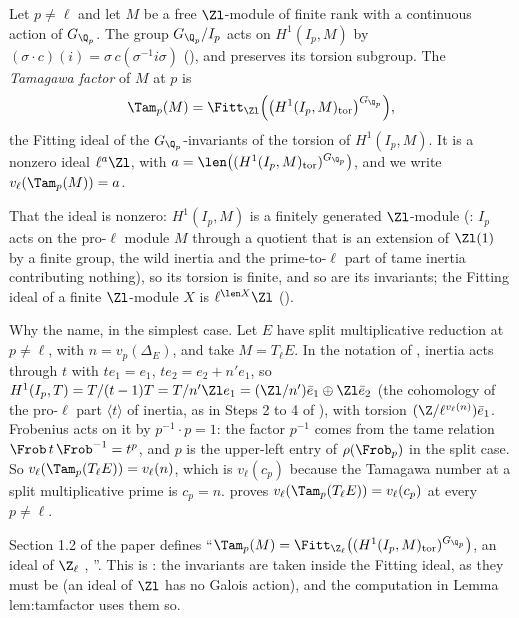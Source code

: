 \begin{definition}\label{def:blochkato:tamagawa}
Let $p\ne\ell$ and let $M$ be a free $\Zl$-module of finite rank with a continuous action of $G_{\Q_p}$. The group $G_{\Q_p}/I_p$ acts on $H^1(I_p,M)$ by
$(\sigma\cdot c)(i)=\sigma\,c(\sigma^{-1}i\sigma)$ (), and preserves its torsion subgroup. The \emph{Tamagawa factor} of $M$ at $p$ is
\[
\Tam_p(M)=\Fitt_{\Zl}\Bigl(\bigl(H^1(I_p,M)_{\mathrm{tor}}\bigr)^{G_{\Q_p}}\Bigr),
\]
the Fitting ideal of the $G_{\Q_p}$-invariants of the torsion of $H^1(I_p,M)$. It is a nonzero ideal $\ell^a\Zl$, with $a=\len\bigl((H^1(I_p,M)_{\mathrm{tor}})^{G_{\Q_p}}\bigr)$, and we write
$v_\ell(\Tam_p(M))=a$.
\end{definition}

That the ideal is nonzero: $H^1(I_p,M)$ is a finitely generated $\Zl$-module (: $I_p$ acts on the pro-$\ell$ module $M$ through a quotient that is an
extension of $\Zl(1)$ by a finite group, the wild inertia and the prime-to-$\ell$ part of tame inertia contributing nothing), so its torsion is finite, and so are its
invariants; the Fitting ideal of a finite $\Zl$-module $X$ is $\ell^{\len X}\Zl$ ().

Why the name, in the simplest case. Let $E$ have split multiplicative reduction at $p\ne\ell$, with $n=v_p(\Delta_E)$, and take $M=T_\ell E$. In the notation of
, inertia acts through $t$ with $te_1=e_1$, $te_2=e_2+n'e_1$, so $H^1(I_p,T)=T/(t-1)T=T/n'\Zl e_1=(\Zl/n')\bar e_1\oplus\Zl\bar e_2$ (the
cohomology of the pro-$\ell$ part $\langle t\rangle$ of inertia, as in Steps 2 to 4 of ), with torsion $(\Z/\ell^{v_\ell(n)})\bar e_1$. Frobenius acts on
it by $p^{-1}\cdot p=1$: the factor $p^{-1}$ comes from the tame relation $\Frob\,t\,\Frob^{-1}=t^p$, and $p$ is the upper-left entry of $\rho(\Frob_p)$ in the split case. So
$v_\ell(\Tam_p(T_\ell E))=v_\ell(n)$, which is $v_\ell(c_p)$ because the Tamagawa number at a split multiplicative prime is $c_p=n$.  proves
$v_\ell(\Tam_p(T_\ell E))=v_\ell(c_p)$ at every $p\ne\ell$.

\begin{paperlink}
\sloppy Section 1.2 of the paper defines ``$\Tam_p(M)=\Fitt_{\Z_\ell}\bigl((H^1(I_p,M)_{\mathrm{tor}})^{G_{\Q_p}}\bigr)$, an ideal of $\Z_\ell$ \cite[p.~708]{DFG04},
\cite[I.4.2.2]{FPR94}''. This is : the invariants are taken inside the Fitting ideal, as they must be (an ideal of $\Zl$ has no
Galois action), and the computation in Lemma lem:tamfactor uses them so.
\end{paperlink}

